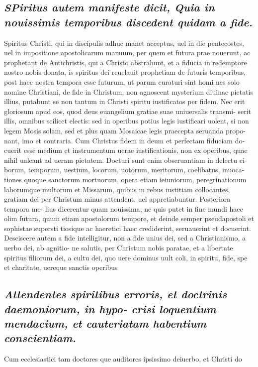 \documentclass{article}
\begin{document}
\begin{pages}
\subsection*{\textit{\huge\textbf{S}\normalsize Piritus autem manifeste dicit, Quia in nouissimis temporibus discedent quidam a fide. }}\pstart Spiritus Christi, qui in discipulis adhuc manet acceptus, uel in die pentecostes, uel in impositione apostolicarum manuum, per quem et futura prae nouerunt, ac prophetant de Antichristis, qui a Christo abstrahunt, et a fiducia in redemptore nostro nobis donata, is spiritus dei reuelauit prophetiam de futuris temporibus, post haec nostra tempora esse futurum, ut parum curaturi sint homi nes solo nomine Christiani, de fide in Christum, non agnoscent mysterium diuinae pietatis illius, putabunt se non tantum in Christi spiritu iustificatos per fidem. Nec erit gloriosum apud eos, quod deus euangelium gratiae suae uniuersalis transmi- serit illis, omnibus scilicet electis: sed in operibus potius legis iustificari uolent, si non legem Mosis solam, sed et plus quam Mosaicae legis praecepta seruanda propo- nant, imo et contraria. Cum Christus fidem in deum et perfectam fiduciam do- cuerit esse medium et instrumentum uerae iustificationis, non ex operibus, quae nihil ualeant ad ueram pietatem. Docturi sunt enim obseruantiam in delectu ci- borum, temporum, uestium, locorum, uotorum, meritorum, coelibatus, inuoca- tiones quoque sanctorum mortuorum, opera etiam ieiuniorum, peregrinationum laborumque multorum et Missarum, quibus in rebus iustitiam collocantes, gratiam dei per Christum minus attendent, uel appretiabuntur. Posteriora tempora me- lius dicerentur quam nouissima, ne quis putet in fine mundi haec olim futura, quum etiam apostolorum tempore, et deinde semper pseudapostoli et sophistae supersti tiosique ac haeretici haec crediderint, seruauerint et docuerint. Desciscere autem a fide intelligitur, non a fide unius dei, sed a Christianismo, a uerbo dei, ab agnitio- ne salutis, per Christum nobis paratae, et a libertate spiritus filiorum dei, a cultu dei, quo uere dominus uult coli, in spiritu, fide, spe et charitate, uereque sanctis operibus   \pend
{}
{}
\subsection*{\textit{Attendentes spiritibus erroris, et doctrinis daemoniorum, in hypo- crisi loquentium mendacium, et cauteriatam habentium conscientiam. }}\pstart Cum ecclesiastici tam doctores que auditores ipsissimo deiuerbo, et Christi do  \pend

\end{pages}
\end{document}
